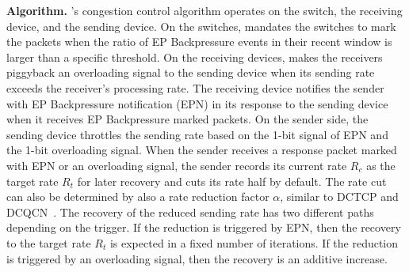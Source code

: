 \noindent \textbf{Algorithm.}
\aurelia's congestion control algorithm operates on the switch, the receiving device, and the sending device.
%
On the switches, \aurelia mandates the switches to mark the packets when the ratio of EP Backpressure events in their recent window is larger than a specific threshold.
%
On the receiving devices, \aurelia makes the receivers piggyback an overloading signal to the sending device when its sending rate exceeds the receiver's processing rate.
%
The receiving device notifies the sender with EP Backpressure notification (EPN) in its response to the sending device when it receives EP Backpressure marked packets. 
%
On the sender side, the sending device throttles the sending rate based on the 1-bit signal of EPN and the 1-bit overloading signal. 
%
When the sender receives a response packet marked with EPN or an overloading signal, the sender records its current rate $R_{c}$ as the target rate $R_{t}$ for later recovery and cuts its rate half by default. 
%
The rate cut can also be determined by also a rate reduction factor $\alpha$, similar to DCTCP and DCQCN~\cite{dcqcn:sigcomm:2015}.   
%
The recovery of the reduced sending rate has two different paths depending on the trigger.
%
If the reduction is triggered by EPN, then the recovery to the target rate $R_{t}$ is expected in a fixed number of iterations. 
%  
If the reduction is triggered by an overloading signal, then the recovery is an additive increase.

%


